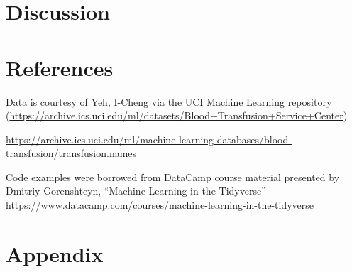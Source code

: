 \documentclass[]{article}
\newenvironment{Shaded}{\begin{snugshade}}{\end{snugshade}}
\newcommand{\KeywordTok}[1]{\textcolor[rgb]{0.13,0.29,0.53}{\textbf{#1}}}
\newcommand{\StringTok}[1]{\textcolor[rgb]{0.31,0.60,0.02}{#1}}
\newcommand{\CommentTok}[1]{\textcolor[rgb]{0.56,0.35,0.01}{\textit{#1}}}
\newcommand{\OperatorTok}[1]{\textcolor[rgb]{0.81,0.36,0.00}{\textbf{#1}}}
\newcommand{\NormalTok}[1]{#1}
\begin{document}
\begin{Shaded}
\end{Shaded}

\section{Discussion}\label{discussion}

\section{References}\label{references}

Data is courtesy of Yeh, I-Cheng via the UCI Machine Learning repository
(\url{https://archive.ics.uci.edu/ml/datasets/Blood+Transfusion+Service+Center})

\url{https://archive.ics.uci.edu/ml/machine-learning-databases/blood-transfusion/transfusion.names}

Code examples were borrowed from DataCamp course material presented by
Dmitriy Gorenshteyn, ``Machine Learning in the Tidyverse''
\url{https://www.datacamp.com/courses/machine-learning-in-the-tidyverse}

\section{Appendix}\label{appendix}
\end{document}

